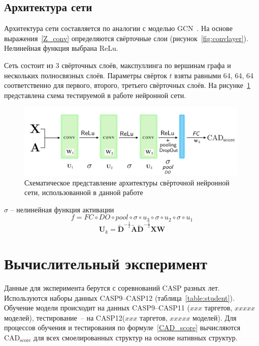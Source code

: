 \documentclass[14pt]{extarticle}
\begin{document}
\subsection{Архитектура сети}
Архитектура сети составляется по аналогии с моделью GCN~\cite{kipf_semi-supervised_2017}. На основе выражения~\eqref{Z_conv} определяются свёрточные слои (рисунок~\ref{fig:convlayer}). Нелинейная функция выбрана ReLu.

Сеть состоит из 3 свёрточных слоёв, макспуллинга по вершинам графа и нескольких полносвязных слоёв. Параметры свёрток $t$ взяты равными 64, 64, 64 соответственно для первого, второго, третьего свёрточных слоёв. На рисунке~\ref{fig:scheme} представлена схема тестируемой в работе нейронной сети.
\begin{figure}[h]
	\centering
	\includegraphics[width=0.99\textwidth]{net.pdf}
	\caption{Схематическое представление архитектуры свёрточной нейронной сети, использованной в данной работе}
	\label{fig:scheme}
\end{figure}
$\sigma$ – нелинейная функция активации
$$f = FC \circ DO \circ pool \circ \sigma \circ u_3\circ\sigma\circ u_2\circ\sigma\circ u_1$$
$$\textbf{U}_k= \tilde{\mathbf{D}}^{-\frac{1}{2}} \tilde{\mathbf{A}}\tilde{\mathbf{D}}^{-\frac{1}{2}} \mathbf{X} \mathbf{W}$$

\section{Вычислительный эксперимент}
Данные для эксперимента берутся с соревнований CASP разных лет. Используются наборы данных CASP9--CASP12 (таблица~\ref{table:student}). Обучение модели происходит на данных CASP9--CASP11 ($xxx$ таргетов, $xxxxx$ моделей), тестирование~-- на CASP12($xxx$ таргетов, $xxxxx$ моделей). Для процессов обучения и тестирования по формуле~\eqref{CAD_score} вычисляются $\text{CAD}_\text{score}$ для всех смоелированных структур на основе нативных структур. 
\end{document}

